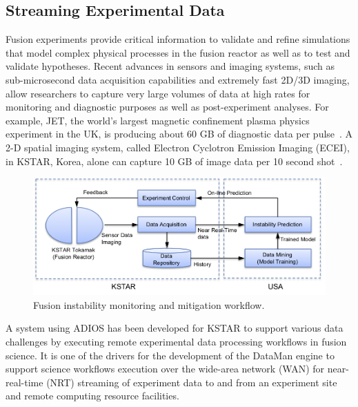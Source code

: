 \subsection{Streaming Experimental Data}

Fusion experiments provide critical information to validate and refine simulations that model complex physical processes in the fusion reactor as well as to test and validate hypotheses. 
Recent advances in sensors and imaging systems, such as sub-microsecond data acquisition capabilities and extremely fast 2D/3D imaging, allow researchers to capture very large volumes of data at high rates for monitoring and diagnostic purposes as well as post-experiment analyses. For example, JET, the world's largest magnetic confinement plasma physics experiment in the UK, is producing about 60 GB of diagnostic data per pulse~\cite{farthing2006data}. A 2-D spatial imaging system, called Electron Cyclotron Emission Imaging (ECEI), in KSTAR, Korea, alone can capture 10 GB of image data per 10 second shot~\cite{yun2010development}.

\begin{figure}[b]
\sidecaption
\includegraphics[width=1\linewidth]{figures/kstar-workflow.png}
\caption{Fusion instability monitoring and mitigation workflow.}
\label{fig:fusion_workflow}
\end{figure}

A system using ADIOS has been developed for KSTAR to support various data challenges by executing remote experimental data processing workflows in fusion science. It is one of the drivers for the development of the DataMan engine to support science workflows execution over the wide-area network (WAN) for near-real-time (NRT) streaming of experiment data to and from an experiment site and remote computing resource facilities. 

